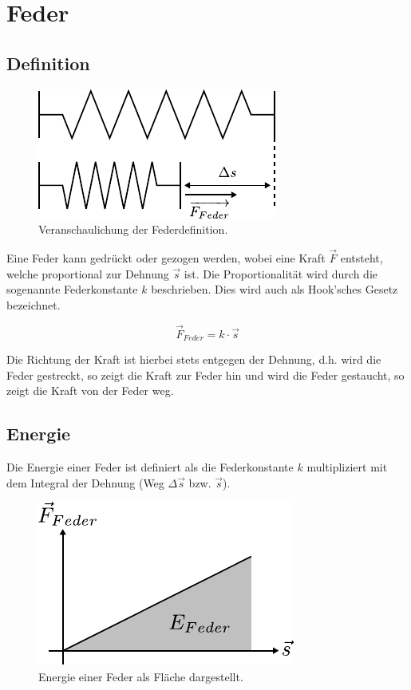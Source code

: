 \chapter{Feder}

\newpage
\section{Definition}

\begin{figure}[h!]
	\centering
	\includegraphics[scale=0.75]{feder-dehnung.pdf}
	\caption{Veranschaulichung der Federdefinition.}
	\label{fig:feder-dehnung}
\end{figure}

\noindent
Eine Feder kann gedrückt oder gezogen werden, wobei eine Kraft $\vec{F}$ 
entsteht, welche proportional zur Dehnung $\vec{s}$ ist. 
Die Proportionalität wird durch die sogenannte Federkonstante $k$ 
beschrieben. Dies wird auch als Hook'sches Gesetz bezeichnet.

\[ \boxed{\vec{F}_{Feder} = k \cdot \vec{s}} \]

\noindent
Die Richtung der Kraft ist hierbei stets entgegen der Dehnung, d.h. wird die
Feder gestreckt, so zeigt die Kraft zur Feder hin und wird die Feder
gestaucht, so zeigt die Kraft von der Feder weg.

\section{Energie}\label{sec:feder-energie}
Die Energie einer Feder ist definiert als die Federkonstante $k$ multipliziert
mit dem Integral der Dehnung (Weg $\Delta \vec{s}$ bzw. $\vec{s}$).
\begin{figure}[h!]
	\centering
	\includegraphics[scale=0.9]{feder-energie.pdf}
	\caption{Energie einer Feder als Fläche dargestellt.}
	\label{fig:feder-energie}
\end{figure}

